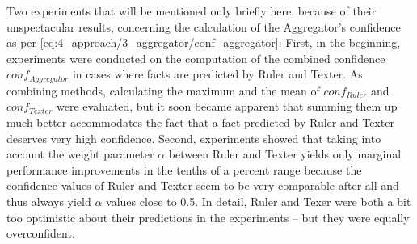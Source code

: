 Two experiments that will be mentioned only briefly here, because of their unspectacular results, concerning the calculation of the Aggregator's confidence as per \autoref{eq:4_approach/3_aggregator/conf_aggregator}: First, in the beginning, experiments were conducted on the computation of the combined confidence $conf_{Aggregator}$ in cases where facts are predicted by Ruler and Texter. As combining methods, calculating the maximum and the mean of $conf_{Ruler}$ and $conf_{Texter}$ were evaluated, but it soon became apparent that summing them up much better accommodates the fact that a fact predicted by Ruler and Texter deserves very high confidence. Second, experiments showed that taking into account the weight parameter $\alpha$ between Ruler and Texter yields only marginal performance improvements in the tenths of a percent range because the confidence values of Ruler and Texter seem to be very comparable after all and thus always yield $\alpha$ values close to 0.5. In detail, Ruler and Texer were both a bit too optimistic about their predictions in the experiments -- but they were equally overconfident.
